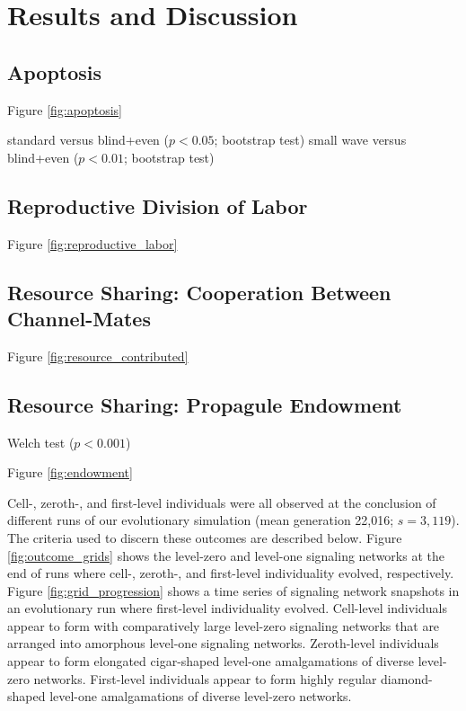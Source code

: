 \section{Results and Discussion}


















\subsection{Apoptosis}

Figure \ref{fig:apoptosis}

standard versus blind+even ($p < 0.05$; bootstrap test)
small wave versus blind+even ($p < 0.01$; bootstrap test)

\subsection{Reproductive Division of Labor}

Figure \ref{fig:reproductive_labor}

\subsection{Resource Sharing: Cooperation Between Channel-Mates}

Figure \ref{fig:resource_contributed}

\subsection{Resource Sharing: Propagule Endowment}

Welch test ($p < 0.001$)

Figure \ref{fig:endowment}


Cell-, zeroth-, and first-level individuals were all observed at the conclusion of different runs of our evolutionary simulation (mean generation 22,016; $s=3,119$).
The criteria used to discern these outcomes are described below.
Figure \ref{fig:outcome_grids} shows the level-zero and level-one signaling networks at the end of runs where cell-, zeroth-, and first-level individuality evolved, respectively.
Figure \ref{fig:grid_progression} shows a time series of signaling network snapshots in an evolutionary run where first-level individuality evolved.
Cell-level individuals appear to form with comparatively large level-zero signaling networks that are arranged into amorphous level-one signaling networks.
Zeroth-level individuals appear to form elongated cigar-shaped level-one amalgamations of diverse level-zero networks.
First-level individuals appear to form highly regular diamond-shaped level-one amalgamations of diverse level-zero networks.

